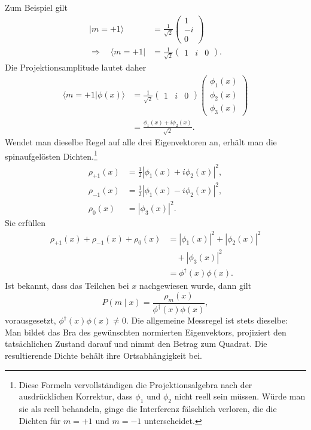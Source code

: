 Zum Beispiel gilt
\begin{equation}
\begin{aligned}
|m=+1\rangle
&=
\frac{1}{\sqrt2}
\begin{pmatrix}
1\\
-i\\
0
\end{pmatrix}
\\
\Longrightarrow\quad\langle m=+1|
&=
\frac{1}{\sqrt2}
\begin{pmatrix}
1&i&0
\end{pmatrix}.
\end{aligned}
\end{equation}
Die Projektionsamplitude lautet daher
\begin{align}
\langle m=+1|\phi(x)\rangle
&=
\frac{1}{\sqrt2}
\begin{pmatrix}
1&i&0
\end{pmatrix}
\begin{pmatrix}
\phi_1(x)\\
\phi_2(x)\\
\phi_3(x)
\end{pmatrix}\\
&=
\frac{\phi_1(x)+i\phi_2(x)}{\sqrt2}.
\end{align}
Wendet man dieselbe Regel auf alle drei Eigenvektoren an, erhält man die spinaufgelösten Dichten.\footnote{Diese Formeln vervollständigen die Projektionsalgebra nach der ausdrücklichen Korrektur, dass \(\phi_1\) und \(\phi_2\) nicht reell sein müssen. Würde man sie als reell behandeln, ginge die Interferenz fälschlich verloren, die die Dichten für \(m=+1\) und \(m=-1\) unterscheidet.}
\begin{align}
\rho_{+1}(x)
&=
\frac12\left|\phi_1(x)+i\phi_2(x)\right|^2,\\
\rho_{-1}(x)
&=
\frac12\left|\phi_1(x)-i\phi_2(x)\right|^2,\\
\rho_0(x)
&=
|\phi_3(x)|^2.
\end{align}
Sie erfüllen
\begin{equation}
\begin{aligned}
\rho_{+1}(x)+\rho_{-1}(x)+\rho_0(x)
&=
|\phi_1(x)|^2+|\phi_2(x)|^2
\\
&\quad{}+|\phi_3(x)|^2
\\
&=
\phi^\dagger(x)\phi(x).
\end{aligned}
\end{equation}
Ist bekannt, dass das Teilchen bei \(x\) nachgewiesen wurde, dann gilt
\begin{equation}
P(m\mid x)
=
\frac{\rho_m(x)}{\phi^\dagger(x)\phi(x)},
\end{equation}
vorausgesetzt, \(\phi^\dagger(x)\phi(x)\neq0\). Die allgemeine Messregel ist stets dieselbe: Man bildet das Bra des gewünschten normierten Eigenvektors, projiziert den tatsächlichen Zustand darauf und nimmt den Betrag zum Quadrat. Die resultierende Dichte behält ihre Ortsabhängigkeit bei.

